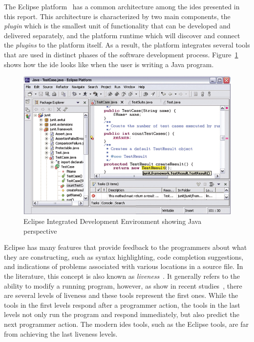 The Eclipse platform~\cite{DesRivieres2004} has a common architecture among the \glspl{ide} presented in this report. This architecture is characterized by two main components, the \textit{plugin} which is the smallest unit of functionality that can be developed and delivered separately, and the platform runtime which will discover and connect the \textit{plugins} to the platform itself. As a result, the platform integrates several tools that are used in distinct phases of the software development process. Figure~\ref{fig:eclipse} shows how the \gls{ide} looks like when the user is writing a Java program. 

\begin{figure}[!htbp]
  \centering
  \includegraphics[width=1.0\textwidth]{images/eclipse}
    \caption{Eclipse Integrated Development Environment showing Java perspective}
  \label{fig:eclipse}
\end{figure} 

Eclipse has many features that provide feedback to the programmers about what they are constructing, such as syntax highlighting, code completion suggestions, and indications of problems associated with various locations in a source file. In the literature, this concept is also known as \textit{liveness}~\cite{alpern1985defining}. It generally refers to the ability to modify a running program, however, as show in recent studies~\cite{tanimoto2013perspective}, there are several levels of liveness and these tools represent the first ones. While the tools in the first levels respond after a programmer action, the tools in the last levels not only run the program and respond immediately, but also predict the next programmer action. The modern \glspl{ide} tools, such as the Eclipse tools, are far from achieving the last liveness levels.

